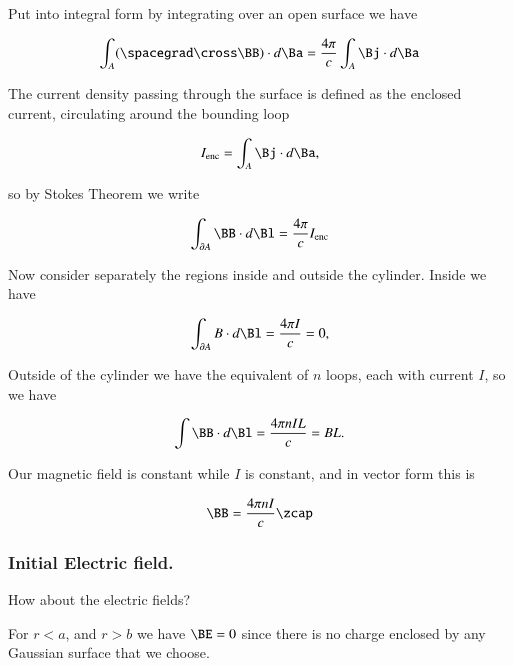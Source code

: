 Put into integral form by integrating over an open surface we have

\begin{equation}\label{eqn:relativisticElectrodynamicsT5:30}
\int_A (\spacegrad \cross \BB) \cdot d\Ba = \frac{4 \pi}{c} \int_A \Bj \cdot d\Ba
\end{equation}

The current density passing through the surface is defined as the enclosed current, circulating around the bounding loop

\begin{equation}\label{eqn:relativisticElectrodynamicsT5:50}
I_{\text{enc}} = \int_A \Bj \cdot d\Ba,
\end{equation}

so by Stokes Theorem we write

\begin{equation}\label{eqn:relativisticElectrodynamicsT5:70}
\int_{\partial A} \BB \cdot d\Bl = \frac{4 \pi}{c} I_{\text{enc}}
\end{equation}

Now consider separately the regions inside and outside the cylinder.  Inside we have

\begin{equation}\label{eqn:relativisticElectrodynamicsT5:71}
\int_{\partial A} B \cdot d \Bl = \frac{4 \pi I }{c} = 0,
\end{equation}

Outside of the cylinder we have the equivalent of $n$ loops, each with current $I$, so we have

\begin{equation}\label{eqn:relativisticElectrodynamicsT5:90}
\int \BB \cdot d\Bl = \frac{4 \pi n I L}{c} = B L.
\end{equation}

Our magnetic field is constant while $I$ is constant, and in vector form this is

\begin{equation}\label{eqn:relativisticElectrodynamicsT5:110}
\BB = \frac{4 \pi n I}{c} \zcap
\end{equation}

\subsubsection{Initial Electric field.}

How about the electric fields?

For $r < a$, and $r > b$ we have $\BE = 0$ since there is no charge enclosed by any Gaussian surface that we choose.

